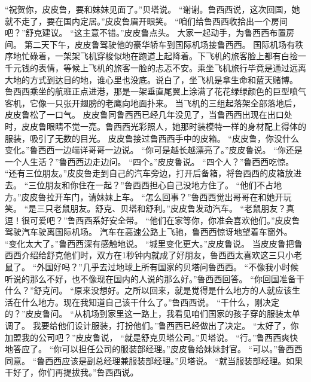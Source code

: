 \documentclass[a4paper,12pt,UTF8,twoside]{ctexbook}
\begin{document}
        “祝贺你，皮皮鲁，要和妹妹见面了。”贝塔说。 
        “谢谢。鲁西西说，这次回国，她就不走了，要在国内定居。”皮皮鲁眉开眼笑。 
        “咱们给鲁西西收拾出一个房间吧？”舒克建议。 
        “这主意不错。”皮皮鲁点头。 
        大家一起动手，为鲁西西布置房间。 
        第二天下午，皮皮鲁驾驶他的豪华轿车到国际机场接鲁西西。 
        国际机场有秩序地忙碌着，一架架飞机穿梭似地在跑道上起降着。下飞机的旅客脸上都有白捡一千元钱的表情，等候上飞机的旅客一脸的忐忑不安。乘坐飞机旅行毕竟是通过远离大地的方式到达目的地，谁心里也没底。说白了，坐飞机是拿生命和蓝天赌博。 
        鲁西西乘坐的航班正点进港，那是一架垂直尾翼上涂满了花花绿绿颜色的巨型喷气客机，它像一只张开翅膀的老鹰向地面扑来。 
        当飞机的三组起落架全部落地后，皮皮鲁松了一口气。 
        皮皮鲁同鲁西西已经几年没见了，当鲁西西出现在出口处时，皮皮鲁眼睛不觉一亮。鲁西西光彩照人，她那时装模特一样的身材配上得体的服装，吸引了无数的目光。 
        皮皮鲁接过鲁西西手中的皮箱。 
        “皮皮鲁，你没什么变化。”鲁西西一边端详哥哥一边说。 
        “你可是越长越漂亮了。”皮皮鲁说。 
        “你还是一个人生活？”鲁西西边走边问。 
        “四个。”皮皮鲁说。 
        “四个人？”鲁西西吃惊。 
        “还有三位朋友。”皮皮鲁走到自己的汽车旁边，打开后备箱，将鲁西西的皮箱放进去。 
        “三位朋友和你住在一起？”鲁西西担心自己没地方住了。 
        “他们不占地方。”皮皮鲁拉开车门，请妹妹上车。 
        “怎么回事？”鲁西西觉出哥哥在和她开玩笑。 
        “是三只老鼠朋友。舒克、贝塔和舒利。”皮皮鲁发动汽车。 
        “老鼠朋友？真逗！很可爱吧？”鲁西西系好安全带。 
        “他们在家等你，你准会喜欢他们。”皮皮鲁驾驶汽车驶离国际机场。 
        汽车在高速公路上飞驰，鲁西西惊讶地望着车窗外。 
        “变化太大了。”鲁西西深有感触地说。 
        “城里变化更大。”皮皮鲁说。 
        当皮皮鲁把鲁西西介绍给舒克他们时，双方在1秒钟内就成了好朋友，鲁西西太喜欢这三只小老鼠了。 
        “外国好吗？”几乎去过地球上所有国家的贝塔问鲁西西。 
        “不像我小时候听说的那么不好，也不像现在国内的人说的那么好。”鲁西西回答。 
        “你回国准备干什么？”舒克问。 
        “原来没想好。之所以回来，就是觉得是什么地方的人就应该生活在什么地方。现在我知道自己该干什么了。”鲁西西说。 
        “干什么，刚决定的？”皮皮鲁问。 
        “从机场到家里这一路上，我看见咱们国家的孩子穿的服装太单调了。 
        我要给他们设计服装，打扮他们。”鲁西西已经做出了决定。 
        “太好了，你加盟我的公司吧？”皮皮鲁说， 
        “就是舒克贝塔公司。”贝塔说。 
        “行。”鲁西西爽快地答应了。 
        “你可以担任公司的服装部经理。”皮皮鲁给妹妹封官。 
        “可以。”鲁西西同意。 
        “鲁西西应该是副总经理兼服装部经理。”贝塔说。 
        “就当服装部经理。如果干好了，你们再提拔我。”鲁西西说。 
\end{document}
